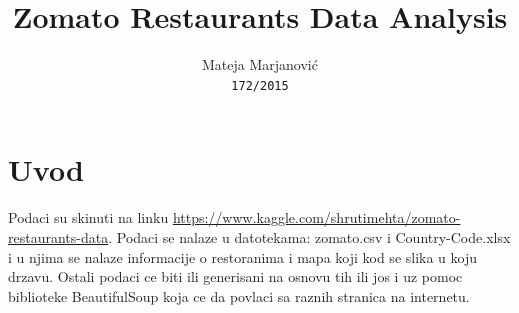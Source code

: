 \documentclass[11pt]{article} %
\title{Zomato Restaurants Data Analysis}
\author{
Mateja Marjanović\\
\texttt{172/2015}
}
\begin{document}
\maketitle
\newpage

\doublespacing
\tableofcontents
\singlespacing
\newpage


\section{Uvod}
Podaci su skinuti na linku \url{https://www.kaggle.com/shrutimehta/zomato-restaurants-data}. Podaci se nalaze u datotekama: zomato.csv i Country-Code.xlsx i u njima se nalaze informacije o restoranima i mapa koji kod se slika u koju drzavu. Ostali podaci ce biti ili generisani na osnovu tih ili jos i uz pomoc biblioteke
BeautifulSoup koja ce da povlaci sa raznih stranica na internetu.
\end{document}
